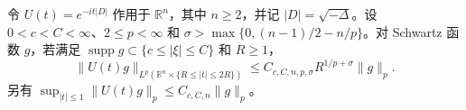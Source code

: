 令 $U(t)=e^{-it|D|}$ 作用于 $\mathbb R^n$，其中 $n\ge2$，并记 $|D|=\sqrt{-\Delta}$。设 $0<c<C<\infty$、$2\le p<\infty$ 和 $\sigma>\max\{0,(n-1)/2-n/p\}$。对 Schwartz 函数 $g$，若满足 $\operatorname{supp}\widehat g\subset\{c\le|\xi|\le C\}$ 和 $R\ge1$，
\[
\|U(t)g\|_{L^p(\mathbb R^n\times\{R\le|t|\le 2R\})}
 \le C_{c,C,n,p,\sigma}R^{1/p+\sigma}\|g\|_p.
\]
另有 $\sup_{|t|\le1}\|U(t)g\|_p\le C_{c,C,n}\|g\|_p$。
